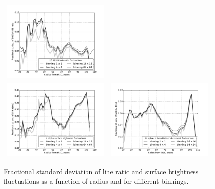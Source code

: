 \documentclass[preprint]{aastex}
\begin{document}
\begin{figure}[p]
\begin{tabular}{ll}
    \includegraphics{sigma-roiii-hb-vs-radius-binning-new} \\
    \includegraphics{sigma-sha-vs-radius-binning-new} &
    \includegraphics{sigma-rha-hb-vs-radius-binning-new}
  \end{tabular}
  \caption{Fractional standard deviation of line ratio and surface
    brightness fluctuations as a function of radius and for different
    binnings.}
  \label{fig:sigma-ratio-hist-vs-radius}
\end{figure}
\end{document}
